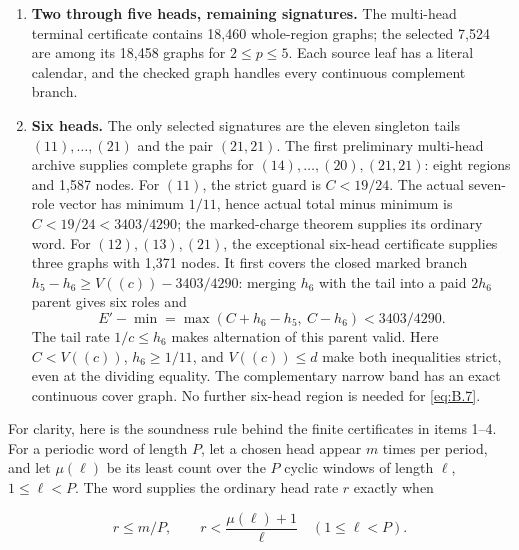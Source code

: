 \documentclass[11pt,a4paper]{article}
\begin{document}
\begin{enumerate}
  \endgroup

  The ordinary caps and actual gaps are recomputed from these words by Lemma~\ref{stmt:A.1}. In the first band, \(b<1/3+1/(2c)\le25/66<2/5\). In the next two, respectively \(b<1/3\) and \(b<5/18<3/10\). For \(c\le20\), \(V((c))\le17/21\) gives \(b<22/105<2/9\) in the fourth band. For \(c=21\), the last band gives \(b<7/30<4/17\). All displayed tail gaps are at most \(c\) in their respective bands. Thus the exact admitted head equality faces are covered.
\item
  \textbf{Two through five heads, remaining signatures.} The multi-head terminal certificate contains 18,460 whole-region graphs; the selected 7,524 are among its 18,458 graphs for \(2\le p\le5\). Each source leaf has a literal calendar, and the checked graph handles every continuous complement branch.
\item
  \textbf{Six heads.} The only selected signatures are the eleven singleton tails \((11),\ldots,(21)\) and the pair \((21,21)\). The first preliminary multi-head archive supplies complete graphs for \((14),\ldots,(20),(21,21)\): eight regions and 1,587 nodes. For \((11)\), the strict guard is \(C<19/24\). The actual seven-role vector has minimum \(1/11\), hence actual total minus minimum is \(C<19/24<3403/4290\); the marked-charge theorem supplies its ordinary word. For \((12),(13),(21)\), the exceptional six-head certificate supplies three graphs with 1,371 nodes. It first covers the closed marked branch \(h_5-h_6\ge V((c))-3403/4290\): merging \(h_6\) with the tail into a paid \(2h_6\) parent gives six roles and \[
   E'-\min=\max(C+h_6-h_5,\ C-h_6)<3403/4290.
  \] The tail rate \(1/c\le h_6\) makes alternation of this parent valid. Here \(C<V((c))\), \(h_6\ge1/11\), and \(V((c))\le d\) make both inequalities strict, even at the dividing equality. The complementary narrow band has an exact continuous cover graph. No further six-head region is needed for \eqref{eq:B.7}.
\end{enumerate}

For clarity, here is the soundness rule behind the finite certificates in items 1--4. For a periodic word of length \(P\), let a chosen head appear \(m\) times per period, and let \(\mu(\ell)\) be its least count over the \(P\) cyclic windows of length \(\ell\), \(1\le\ell<P\). The word supplies the ordinary head rate \(r\) exactly when

\begin{equation}
r\le m/P,\qquad
 r<\frac{\mu(\ell)+1}{\ell}\quad(1\le\ell<P).
\tag{B.8}\label{eq:B.8}
\end{equation}
\end{document}
